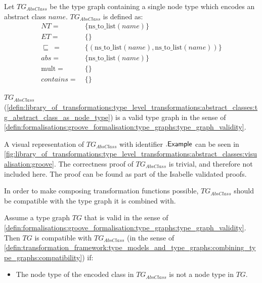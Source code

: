 \begin{defin}
\label{defin:library_of_transformations:type_level_transformations:abstract_classes:tg_abstract_class_as_node_type}
Let $TG_{AbsClass}$ be the type graph containing a single node type which encodes an abstract class $name$. $TG_{AbsClass}$ is defined as:
\begin{align*}
NT =\ &\{\mathrm{ns\_\!to\_\!list}(name)\} \\
ET =\ &\{\} \\
\!\!\sqsubseteq\ =\ &\{(\mathrm{ns\_\!to\_\!list}(name), \mathrm{ns\_\!to\_\!list}(name))\} \\
abs =\ &\{\mathrm{ns\_\!to\_\!list}(name)\} \\
\mathrm{mult} =\ &\{\} \\
contains =\ &\{\}
\end{align*}
\end{defin}

\begin{thm}
\label{defin:library_of_transformations:type_level_transformations:abstract_classes:tg_abstract_class_as_node_type_correct}
$TG_{AbsClass}$ (\cref{defin:library_of_transformations:type_level_transformations:abstract_classes:tg_abstract_class_as_node_type}) is a valid type graph in the sense of \cref{defin:formalisations:groove_formalisation:type_graphs:type_graph_validity}.
\end{thm}

A visual representation of $TG_{AbsClass}$ with identifier $.\mathsf{Example}$ can be seen in \cref{fig:library_of_transformations:type_level_transformations:abstract_classes:visualisation:groove}. The correctness proof of $TG_{AbsClass}$ is trivial, and therefore not included here. The proof can be found as part of the Isabelle validated proofs.

In order to make composing transformation functions possible, $TG_{AbsClass}$ should be compatible with the type graph it is combined with.

\begin{thm}
\label{defin:library_of_transformations:type_level_transformations:abstract_classes:tg_abstract_class_as_node_type_combine_correct}
Assume a type graph $TG$ that is valid in the sense of \cref{defin:formalisations:groove_formalisation:type_graphs:type_graph_validity}. Then $TG$ is compatible with $TG_{AbsClass}$ (in the sense of \cref{defin:transformation_framework:type_models_and_type_graphs:combining_type_graphs:compatibility}) if:
\begin{itemize}
    \item The node type of the encoded class in $TG_{AbsClass}$ is not a node type in $TG$.
\end{itemize}
\end{thm}

